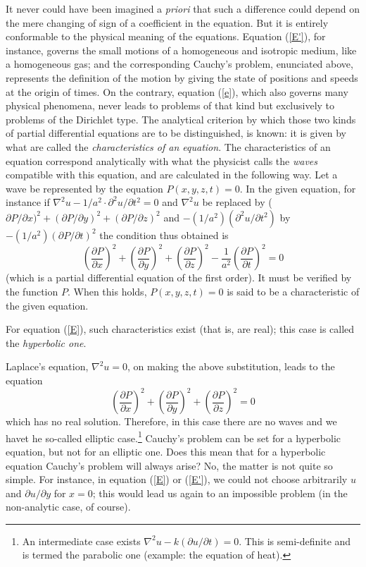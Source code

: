 \documentclass[12pt,oneside]{book}
\newcommand{\iit}[1]{\textit{#1}}
\begin{document}
It never could have been imagined a \iit{priori} that such a difference could depend on the mere changing of sign of a coefficient in the equation. But it is entirely conformable to the physical meaning of the equations. Equation (\ref{E'}), for instance, governs the small motions of a homogeneous and isotropic medium, like a homogeneous gas; and the corresponding Cauchy's problem, enunciated above, represents the definition of the motion by giving the state of positions and speeds at the origin of times. On the contrary, equation (\ref{e}), which also governs many physical phenomena, never leads to problems of that kind but exclusively to problems of the Dirichlet type. The analytical criterion by which those two kinds of partial differential equations are to be distinguished, is known: it is given by what are called the \iit{characteristics of an equation}. The characteristics of an equation correspond analytically with what the physicist calls the \iit{waves} compatible with this equation, and are calculated in the following way. Let a wave be represented by the equation $P(x,y,z,t)=0$. In the given equation, for instance if $\nabla^2u-1/a^2\cdot\partial^2u/\partial t^2=0$ and $\nabla^2u$ be replaced by ($\partial P/\partial x)^2+(\partial P/\partial y)^2+(\partial P/\partial z)^2$ and $-(1/a^2)(\partial^2u/\partial t^2)$ by $-(1/a^2)(\partial P/\partial t)^2$ the condition thus obtained is
\begin{equation*}
    \left(\frac{\partial P}{\partial x}\right)^2+\left(\frac{\partial P}{\partial y}\right)^2+\left(\frac{\partial P}{\partial z}\right)^2-\frac{1}{a^2}\left(\frac{\partial P}{\partial t}\right)^2=0
\end{equation*}
(which is a partial differential equation of the first order). It must be verified by the function $P$. When this holds, $P(x,y,z,t)=0$ is said to be a characteristic of the given equation. \par

For equation (\ref{E}), such characteristics exist (that is, are real); this case is called the \iit{hyperbolic one}. \par

Laplace's equation, $\nabla^2u=0$, on making the above substitution, leads to the equation
\begin{equation*}
    \left(\frac{\partial P}{\partial x}\right)^2 + \left(\frac{\partial P}{\partial y}\right)^2 + \left(\frac{\partial P}{\partial z}\right)^2 = 0
\end{equation*}
which has no real solution. Therefore, in this case there are no waves and we havet he so-called elliptic case.\footnote{An intermediate case exists $\nabla^2u-k(\partial u/\partial t)=0$. This is semi-definite and is termed the parabolic one (example: the equation of heat).} Cauchy's problem can be set for a hyperbolic equation, but not for an elliptic one. Does this mean that for a hyperbolic equation Cauchy's problem will always arise? No, the matter is not quite so simple. For instance, in equation (\ref{E}) or (\ref{E'}), we could not choose arbitrarily $u$ and $\partial u/\partial y$ for $x=0$; this would lead us again to an impossible problem (in the non-analytic case, of course). \par
\end{document}
